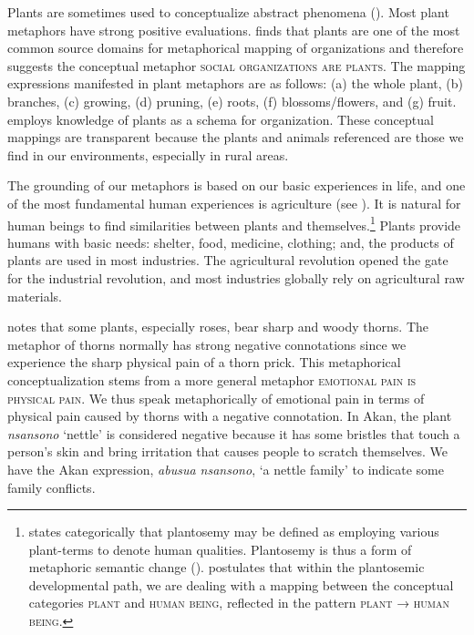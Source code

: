 \documentclass[output=paper,colorlinks,citecolor=brown]{langscibook}
\begin{document}
Plants are sometimes used to conceptualize abstract phenomena (\cite{Kövecses2002}). Most plant metaphors have strong positive evaluations. \citet[8--9]{Kövecses2002} finds that plants are one of the most common source domains for metaphorical mapping of organizations and therefore suggests the conceptual metaphor \textsc{social organizations are plants}. The mapping expressions manifested in plant metaphors are as follows: (a) the whole plant, (b) branches, (c)  growing, (d) pruning, (e) roots, (f) blossoms/flowers, and (g) fruit. \citet[8--9]{Kövecses2002} employs knowledge of plants as a schema for organization. These conceptual mappings are transparent because the plants and animals referenced are those we find in our environments, especially in rural areas. 

The grounding of our metaphors is based on our basic experiences in life, and one of the most fundamental human experiences is agriculture (see \cite[126]{UngererandSchmid2009}). It is natural for human beings to find similarities between plants and themselves.\footnote{\citet[39]{Grząśko2017} states categorically that plantosemy may be defined as employing various plant-terms to denote human qualities. Plantosemy is thus a form of metaphoric semantic change (\cite[80]{GathigiaandMaitaria2019}). \citet[112]{Grząśko2017} postulates that within the plantosemic developmental path, we are dealing with a mapping between the conceptual categories \textsc{plant} and \textsc{human being}, reflected in the pattern \textsc{plant → human being}.}  Plants provide humans with basic needs: shelter, food, medicine, clothing; and, the products of plants are used in most industries. The agricultural revolution opened the gate for the industrial revolution, and most industries globally rely on agricultural raw materials.
 
\citet{Esenova2007} notes that some plants, especially roses, bear sharp and woody thorns. The metaphor of thorns normally has strong negative connotations since we experience the sharp physical pain of a thorn prick. This metaphorical conceptualization stems from a more general metaphor \textsc{emotional pain is physical pain}. We thus speak metaphorically of emotional pain in terms of physical pain caused by thorns with a negative connotation. In Akan, the plant \textit{nsansono} `nettle’ is considered negative because it has some bristles that touch a person’s skin and bring irritation that causes people to scratch themselves. We have the Akan expression, \textit{abusua nsansono}, `a nettle family’ to indicate some family conflicts.
\end{document}
